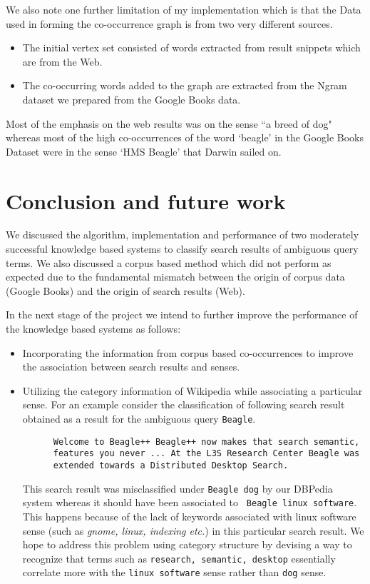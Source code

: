 \documentclass[a4paper,12pt]{report}
\begin{document}
We also note one further limitation of my implementation which is that
the Data used in forming the co-occurrence graph is from two very
different sources.
\begin{itemize}
\item The initial vertex set consisted of words extracted from result snippets
which are from the Web.
\item The co-occurring words added to the graph are extracted from the Ngram
dataset we prepared from the Google Books data. 
\end{itemize}
Most of the emphasis on the web results was on the sense ``a breed of dog"
whereas most of the high co-occurrences of the word `beagle' in the Google
Books Dataset were in the sense `HMS Beagle' that Darwin sailed on.

\chapter {Conclusion and future work}
We discussed the algorithm, implementation and performance of two
moderately successful knowledge based systems to classify search
results of ambiguous query terms. We also discussed a corpus based
method which did not perform as expected due to the fundamental
mismatch between the origin of corpus data (Google Books) and the
origin of search results (Web).

In the next stage of the project we intend to further improve the
performance of the knowledge based systems as follows:

\begin{itemize}
  \item Incorporating the information from corpus based co-occurrences
    to improve the association between search results and senses. 
  \item Utilizing the category information of Wikipedia while
    associating a particular sense. For an example consider the
    classification of following search result obtained as a result for
    the ambiguous query {\tt Beagle}.
    
    \begin{verbatim}
      Welcome to Beagle++ Beagle++ now makes that search semantic,
      features you never ... At the L3S Research Center Beagle was
      extended towards a Distributed Desktop Search.
    \end{verbatim}
    
    This search result was misclassified under {\tt Beagle dog} by our
    DBPedia system whereas it should have been associated to {\tt
      Beagle linux software}. This happens because of the lack of
    keywords associated with linux software sense (such as {\it gnome,
      linux, indexing etc.}) in this particular search result. We hope
    to address this problem using category structure by devising a way
    to recognize that terms such as {\tt research, semantic, desktop}
    essentially correlate more with the {\tt linux software} sense
    rather than {\tt dog} sense.

\end{itemize}

 
 
\end{document}
